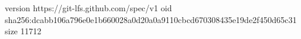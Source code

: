 version https://git-lfs.github.com/spec/v1
oid sha256:dcabb106a796e0e1b660028a0d20a0a9110cbcd670308435e19de2f450d65c31
size 11712
